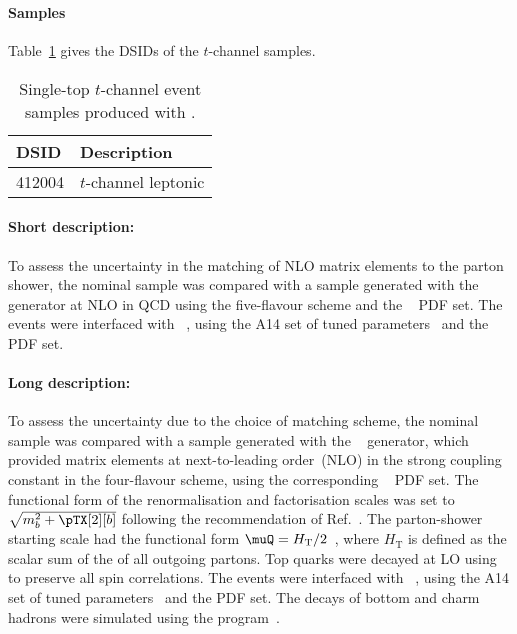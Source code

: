 \subsubsection[MadGraph5\_aMC@NLO+Pythia8]{\MGNLOPY[8]}
\label{subsubsec:tchan_aMCP8}

\paragraph{Samples}

Table~\ref{tab:tchan_aMCP8} gives the DSIDs of the $t$-channel \MGNLOPY[8] samples.

\begin{table}[htbp]
  \caption{Single-top $t$-channel event samples produced with \MGNLOPY[8].}%
  \label{tab:tchan_aMCP8}
  \centering
  \begin{tabular}{l l}
    \toprule
    DSID & Description \\
    \midrule
    412004 & $t$-channel leptonic \\
    \bottomrule
  \end{tabular}
\end{table}

\paragraph{Short description:}

To assess the uncertainty in the matching of NLO matrix elements to the
parton shower, the nominal sample was compared with a sample generated
with the \MGNLO[2.6.2]~\cite{Alwall:2014hca} generator at NLO in QCD using the five-flavour
scheme and the \NNPDF[2.3nlo]~\cite{Ball:2014uwa} PDF set. The events were
interfaced with \PYTHIA[8.230]~\cite{Sjostrand:2014zea}, using the A14
set of tuned parameters~\cite{ATL-PHYS-PUB-2014-021} and the \NNPDF[2.3lo] PDF set.


\paragraph{Long description:}

To assess the uncertainty due to the choice of matching scheme, the nominal sample was compared with a sample generated
with the \MGNLO[2.6.2]~\cite{Alwall:2014hca} generator, which provided matrix elements at next-to-leading order~(NLO) in the strong coupling constant \alphas
in the four-flavour scheme, using the corresponding \NNPDF[3.0nlo]~\cite{Ball:2014uwa} PDF set.
The functional form of the renormalisation and factorisation scales was set to $\sqrt{m_b^2 + \pTX[2][b]}$
following the recommendation of Ref.~\cite{Frederix:2012dh}.
The parton-shower starting scale had the functional form $\muQ = H_\text{T}/2$~\cite{ATL-PHYS-PUB-2017-007}, 
where $H_\text{T}$ is defined as the scalar sum of the \pT of all outgoing partons.
Top quarks were decayed at LO using \MADSPIN~\cite{Frixione:2007zp,Artoisenet:2012st} to preserve all spin correlations.
The events were interfaced with \PYTHIA[8.230]~\cite{Sjostrand:2014zea}, using the A14 set of tuned parameters~\cite{ATL-PHYS-PUB-2014-021} 
and the \NNPDF[2.3lo] PDF set.
The decays of bottom and charm hadrons were simulated using the \EVTGEN[1.6.0] program~\cite{Lange:2001uf}.


